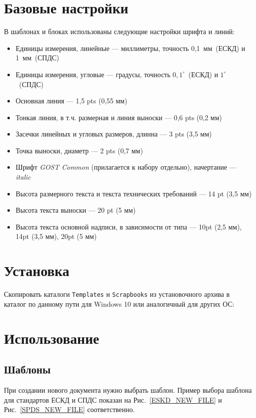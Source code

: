 \documentclass[14pt]{extreport}
\begin{document}
	\section{Базовые настройки}
	В шаблонах и блоках использованы следующие настройки шрифта и линий:
	\begin{itemize}
		\item Единицы измерения, линейные --- миллиметры, точность 0,1~мм~(ЕСКД) и 1~мм~(СПДС)
		\item Единицы измерения, угловые --- градусы, точность $0,1^\circ$~(ЕСКД) и $1^\circ$~(СПДС)
		\item Основная линия --- 1,5 pts (0,55 мм)
		\item Тонкая линия, в т.ч. размерная и линия выноски --- 0,6 pts (0,2 мм)
		\item Засечки линейных и угловых размеров, длинна --- 3 pts (3,5 мм)
		\item Точка выноски, диаметр --- 2 pts (0,7 мм)
		\item Шрифт \textit{GOST Common} (прилагается к набору отдельно), начертание --- \textit{italic}
		\item Высота размерного текста и текста технических требований --- 14 pt (3,5 мм)
		\item Высота текста выноски --- 20 pt (5 мм)
		\item Высота текста основной надписи, в зависимости от типа --- 10pt (2,5 мм), 14pt (3,5 мм), 20pt (5 мм)
	\end{itemize}

	\section{Установка}
	Скопировать каталоги \texttt{Templates} и \texttt{Scrapbooks} из установочного архива в каталог по данному пути для Windows 10 или аналогичный для других ОС:\\

	\noindent
	{\small {}}

	\section{Использование}
	\subsection{Шаблоны}
	При создании нового документа нужно выбрать шаблон. Пример выбора шаблона для стандартов ЕСКД и СПДС показан на Рис.~\ref{ESKD_NEW_FILE} и Рис.~\ref{SPDS_NEW_FILE} соответственно.
\end{document}
